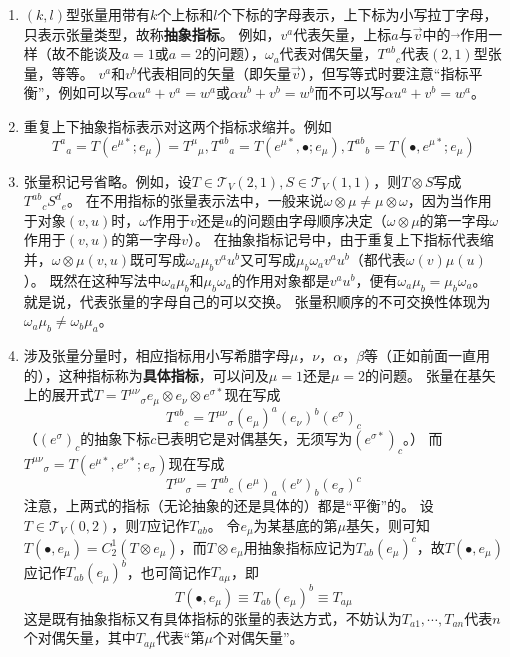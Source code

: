 \begin{enumerate}[1.]
\item $(k, l)$型张量用带有$k$个上标和$l$个下标的字母表示，上下标为小写拉丁字母，只表示张量类型，故称\textbf{抽象指标}。
例如，$v^a$代表矢量，上标$a$与$\vec{v}$中的$\vec{}$作用一样（故不能谈及$a = 1$或$a = 2$的问题），$\omega_a$代表对偶矢量，$T^{ab}{}_c$代表$(2, 1)$型张量，等等。
$v^a$和$v^b$代表相同的矢量（即矢量$\vec{v}$），但写等式时要注意``指标平衡''，例如可以写$\alpha u^a + v^a = w^a$或$\alpha u^b + v^b = w^b$而不可以写$\alpha u^a + v^b = w^a$。
\item 重复上下抽象指标表示对这两个指标求缩并。例如
$$T^a{}_a = T(e^{\mu*}; e_\mu) = T^\mu{}_\mu, T^{ab}{}_a = T(e^{\mu*}, \bullet; e_\mu), T^{ab}{}_b = T(\bullet, e^{\mu*}; e_\mu)$$
\item 张量积记号省略。例如，设$T \in \mathscr{T}_V(2, 1), S \in \mathscr{T}_V(1, 1)$，则$T \otimes S$写成$T^{ab}{}_cS^d{}_e$。
在不用指标的张量表示法中，一般来说$\omega \otimes \mu \neq \mu \otimes \omega$，因为当作用于对象$(v, u)$时，$\omega$作用于$v$还是$u$的问题由字母顺序决定（$\omega \otimes \mu$的第一字母$\omega$作用于$(v, u)$的第一字母$v$）。
在抽象指标记号中，由于重复上下指标代表缩并，$\omega \otimes \mu(v, u)$既可写成$\omega_a\mu_bv^au^b$又可写成$\mu_b\omega_av^au^b$（都代表$\omega(v)\mu(u)$）。
既然在这种写法中$\omega_a\mu_b$和$\mu_b\omega_a$的作用对象都是$v^au^b$，便有$\omega_a\mu_b = \mu_b\omega_a$。
就是说，代表张量的字母自己的可以交换。
张量积顺序的不可交换性体现为$\omega_a\mu_b \neq \omega_b\mu_a$。
\item 涉及张量分量时，相应指标用小写希腊字母$\mu$，$\nu$，$\alpha$，$\beta$等（正如前面一直用的），这种指标称为\textbf{具体指标}，可以问及$\mu = 1$还是$\mu = 2$的问题。
张量在基矢上的展开式$T = T^{\mu\nu}{}_\sigma e_\mu \otimes e_\nu \otimes e^{\sigma*}$现在写成
$$T^{ab}{}_c = T^{\mu\nu}{}_\sigma(e_\mu)^a(e_\nu)^b(e^\sigma)_c$$（$(e^\sigma)_c$的抽象下标$c$已表明它是对偶基矢，无须写为$(e^{\sigma*})_c$。）
而$T^{\mu\nu}{}_\sigma = T(e^{\mu*}, e^{\nu*}; e_\sigma)$现在写成
$$T^{\mu\nu}{}_\sigma = T^{ab}{}_c(e^\mu)_a(e^\nu)_b(e_\sigma)^c$$
注意，上两式的指标（无论抽象的还是具体的）都是``平衡''的。
设$T \in \mathscr{T}_V(0, 2)$，则$T$应记作$T_{ab}$。
令$e_\mu$为某基底的第$\mu$基矢，则可知$T(\bullet, e_\mu) = C^1_2(T \otimes e_\mu)$，而$T \otimes e_\mu$用抽象指标应记为$T_{ab}(e_\mu)^c$，故$T(\bullet, e_\mu)$应记作$T_{ab}(e_\mu)^b$，也可简记作$T_{a\mu}$，即
$$T(\bullet, e_\mu) \equiv T_{ab}(e_\mu)^b \equiv T_{a\mu}$$
这是既有抽象指标又有具体指标的张量的表达方式，不妨认为$T_{a1}, \cdots, T_{an}$代表$n$个对偶矢量，其中$T_{a\mu}$代表``第$\mu$个对偶矢量''。

\end{enumerate}
